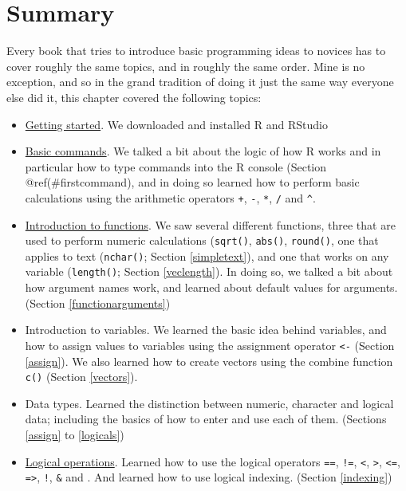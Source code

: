 \documentclass[
]{book}
\providecommand{\tightlist}{%
  \setlength{\itemsep}{0pt}\setlength{\parskip}{0pt}}
\begin{document}
\hypertarget{summary}{%
\section{Summary}\label{summary}}

Every book that tries to introduce basic programming ideas to novices has to cover roughly the same topics, and in roughly the same order. Mine is no exception, and so in the grand tradition of doing it just the same way everyone else did it, this chapter covered the following topics:

\begin{itemize}
\tightlist
\item
  \protect\hyperlink{gettingR}{Getting started}. We downloaded and installed R and RStudio
\item
  \protect\hyperlink{arithmetic}{Basic commands}. We talked a bit about the logic of how R works and in particular how to type commands into the R console (Section @ref(\#firstcommand), and in doing so learned how to perform basic calculations using the arithmetic operators \texttt{+}, \texttt{-}, \texttt{*}, \texttt{/} and \texttt{\^{}}.
\item
  \protect\hyperlink{usingfunctions}{Introduction to functions}. We saw several different functions, three that are used to perform numeric calculations (\texttt{sqrt()}, \texttt{abs()}, \texttt{round()}, one that applies to text (\texttt{nchar()}; Section \ref{simpletext}), and one that works on any variable (\texttt{length()}; Section \ref{veclength}). In doing so, we talked a bit about how argument names work, and learned about default values for arguments. (Section \ref{functionarguments})
\item
  Introduction to variables. We learned the basic idea behind variables, and how to assign values to variables using the assignment operator \texttt{\textless{}-} (Section \ref{assign}). We also learned how to create vectors using the combine function \texttt{c()} (Section \ref{vectors}).
\item
  Data types. Learned the distinction between numeric, character and logical data; including the basics of how to enter and use each of them. (Sections \ref{assign} to \ref{logicals})
\item
  \protect\hyperlink{logicals}{Logical operations}. Learned how to use the logical operators \texttt{==}, \texttt{!=}, \texttt{\textless{}}, \texttt{\textgreater{}}, \texttt{\textless{}=}, \texttt{=\textgreater{}}, \texttt{!}, \texttt{\&} and \texttt{\textbar{}}. And learned how to use logical indexing. (Section \ref{indexing})
\end{itemize}
\end{document}
